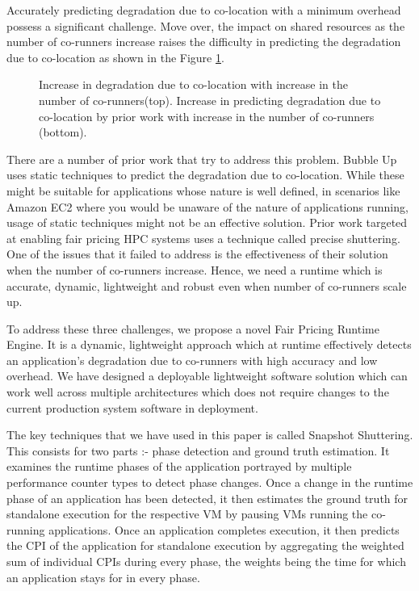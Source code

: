 \documentclass[pageno]{jpaper}
\begin{document}
Accurately predicting degradation due to co-location with a minimum overhead possess a significant challenge\cite{6522315}. Move over, the impact on shared resources as the number of co-runners increase raises the difficulty in predicting the degradation due to co-location as shown in the Figure \ref{fig:degradation}.
\begin{figure}
\centering
\begin{minipage}[t]{1\columnwidth}
\centering
{}
\caption{Increase in degradation due to co-location with increase in the number of co-runners(top). Increase in predicting degradation due to co-location by prior work with increase in the number of co-runners (bottom).}
\label{fig:degradation}
\end{minipage}
\end{figure}

There are a number of prior work that try to address this problem. Bubble Up \cite{bubbleup} uses static techniques to predict the degradation due to co-location. While these might be suitable for applications whose nature is well defined, in scenarios like Amazon EC2 where you would be unaware of the nature of applications running, usage of static techniques might not be an effective solution. Prior work targeted at enabling fair pricing HPC \cite{fairpricing} systems uses a technique called precise shuttering. One of the issues that it failed to address is the effectiveness of their solution when the number of co-runners increase. Hence, we need a runtime which is accurate, dynamic, lightweight and robust even when number of co-runners scale up.

To address these three challenges, we propose a novel Fair Pricing Runtime Engine. It is a dynamic, lightweight approach which at runtime effectively detects an application's degradation due to co-runners with high accuracy and low overhead. We have designed a deployable lightweight software solution which can work well across multiple architectures which does not require changes to the current production system software in deployment.

The key techniques that we have used in this paper is called Snapshot Shuttering. This consists for two parts :- phase detection and ground truth estimation. It examines the runtime phases of the application portrayed by multiple performance counter types to detect phase changes\cite{1598119}\cite{1528455}\cite{1238018}. Once a change in the runtime phase of an application has been detected, it then estimates the ground truth for standalone execution for the respective VM by pausing VMs running the co-running applications. Once an application completes execution, it then predicts the CPI of the application for standalone execution by aggregating the weighted sum of  individual CPIs during every phase, the weights being the time for which an application stays for in every phase.
\end{document}
